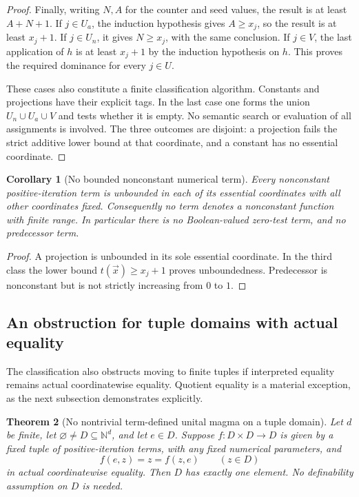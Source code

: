 \documentclass[11pt,letterpaper]{article}
\newtheorem{theorem}{Theorem}[section]
\newtheorem{corollary}[theorem]{Corollary}
\theoremstyle{definition}\newtheorem{definition}[theorem]{Definition}
\theoremstyle{remark}\newtheorem{remark}[theorem]{Remark}
\begin{document}
\begin{proof}
Finally, writing $N,A$ for the counter and seed values, the result is at
least $A+N+1$. If $j\in U_a$, the induction hypothesis gives
$A\geq x_j$, so the result is at least $x_j+1$. If $j\in U_n$, it
gives $N\geq x_j$, with the same conclusion. If $j\in V$, the last
application of $h$ is at least $x_j+1$ by the induction hypothesis on
$h$. This proves the required dominance for every $j\in U$.

These cases also constitute a finite classification algorithm. Constants
and projections have their explicit tags. In the last case one forms
the union $U_n\cup U_a\cup V$ and tests whether it is empty. No
semantic search or evaluation of all assignments is involved.
The three outcomes are disjoint: a projection fails the strict additive
lower bound at that coordinate, and a constant has no essential
coordinate.
\end{proof}

\begin{corollary}[No bounded nonconstant numerical term]
Every nonconstant positive-iteration term is unbounded in each of its
essential coordinates with all other coordinates fixed. Consequently no
term denotes a nonconstant function with finite range. In particular
there is no Boolean-valued zero-test term, and no predecessor term.
\end{corollary}

\begin{proof}
A projection is unbounded in its sole essential coordinate. In the third
class the lower bound $t(\vec x)\geq x_j+1$ proves unboundedness.
Predecessor is nonconstant but is not strictly increasing from $0$ to $1$.
\end{proof}

\subsection{An obstruction for tuple domains with actual equality}

The classification also obstructs moving to finite tuples if interpreted
equality remains actual coordinatewise equality. Quotient equality is a
material exception, as the next subsection demonstrates explicitly.

\begin{theorem}[No nontrivial term-defined unital magma on a tuple domain]
\label{thm:positive-actual-unit}
Let $d$ be finite, let $\varnothing\ne D\subseteq\mathbb N^d$, and let
$e\in D$. Suppose $f:D\times D\to D$ is given by a fixed tuple of
positive-iteration terms, with any fixed numerical parameters, and
\[
                         f(e,z)=z=f(z,e)\qquad(z\in D)
\]
in actual coordinatewise equality. Then $D$ has exactly one element.
No definability assumption on $D$ is needed.
\end{theorem}
\end{document}
